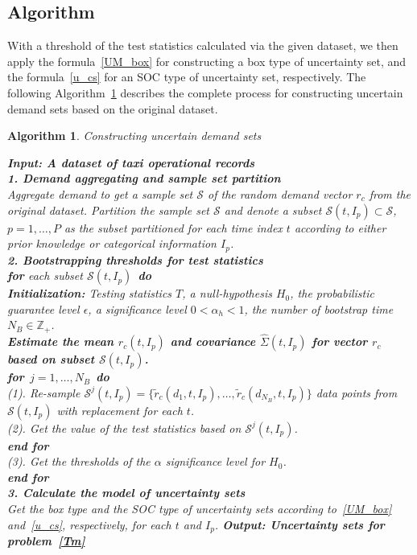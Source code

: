 \documentclass[10pt,twocolumn,twoside,english]{IEEEtran}
\newtheorem{algorithm}{Algorithm}
\begin{document}
\subsection{Algorithm}
\label{algorithm_sec}
With a threshold of the test statistics calculated via the given dataset, we then apply the formula~\eqref{UM_box} for constructing a box type of uncertainty set, and the formula~\eqref{u_cs} for an SOC type of uncertainty set, respectively. The following Algorithm~\ref{alg: algorithm_1} describes the complete process for constructing uncertain demand sets based on the original dataset.

\begin{algorithm}
\caption{Constructing uncertain demand sets}
\textbf{Input: A dataset of taxi operational records}\\
\textbf{1. Demand aggregating and sample set partition}\\
Aggregate demand to get a sample set $\mathcal{S}$ of the random demand vector $r_c$ from the original dataset. Partition the sample set $\mathcal{S}$ and denote a subset $\mathcal{S}(t, I_p)\subset \mathcal{S}$, $p=1,\dots,P$ as the subset partitioned  for each time index $t$ according to either prior knowledge or categorical information $I_p$. \\\textbf{2. Bootstrapping thresholds for test statistics}
\\\textbf{for} each subset $\mathcal{S}(t, I_p)$\ \textbf{do}
\\ \textbf{Initialization:} { Testing statistics $T$, a null-hypothesis $H_0$, the probabilistic guarantee level $\epsilon$, a significance level $0 < \alpha_h <1$, the number of bootstrap time $N_B \in \mathbb{Z}_+$.}\\\textbf{Estimate the mean $\hat{r}_c(t,I_p)$ and covariance $\hat{\Sigma}(t,I_p)$ for vector $r_c$ based on subset $\mathcal{S}(t, I_p)$.} 
\\ \quad \textbf{for}\ $j=1,\dots, N_B$\ \textbf{do}
\\ \quad\quad (1). Re-sample $\mathcal{S}^j(t,I_p)=\{\tilde{r}_c (d_1, t,I_p),\dots,\tilde{r}_c(d_{N_B}, t,I_p)\}$ data points from $\mathcal{S}(t,I_p)$ with replacement for each $t$.
\\ \quad\quad (2). Get the value of the test statistics based on $\mathcal{S}^j(t,I_p)$. \\ \quad \textbf{end for}
\\ \quad (3). Get the thresholds of the $\alpha$ significance level for $H_0$.
\\ \quad \textbf{end for}
\\\textbf{3. Calculate the model of uncertainty sets}\\
Get the box type and the SOC type of uncertainty sets according to~\eqref{UM_box} and~\eqref{u_cs}, respectively, for each $t$ and $I_p$. 
\textbf{Output: Uncertainty sets for problem~\eqref{Tm}}
\label{alg: algorithm_1}
\end{algorithm}
\end{document}

